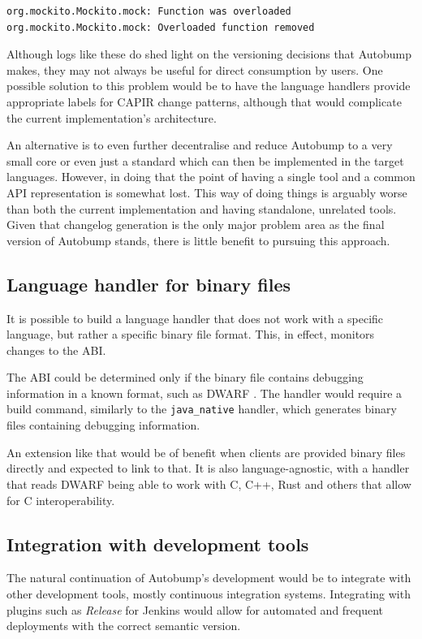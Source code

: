 \documentclass{l4proj}
\newcommand\tricksubsection[1]{
\vspace{-1\baselineskip}\subsection{#1}\vspace{-0.3\baselineskip}}
\newcommand\genericstyle{\lstset{basicstyle=\ttm}}
\newcommand\codeinline[1]{{\genericstyle\lstinline!#1!}}
\begin{document}
\begin{center}
\begin{BVerbatim}
org.mockito.Mockito.mock: Function was overloaded
org.mockito.Mockito.mock: Overloaded function removed
\end{BVerbatim}
\end{center}

Although logs like these do shed light on the versioning decisions
that Autobump makes, they may not always be useful for direct
consumption by users. One possible solution to this problem would
be to have the language handlers provide appropriate labels for CAPIR
change patterns, although that would complicate the current implementation's
architecture.

An alternative is to even further decentralise and reduce Autobump to
a very small core or even just a standard which can then be
implemented in the target languages. However, in doing that the point
of having a single tool and a common API representation is somewhat
lost. This way of doing things is arguably worse than both the current
implementation and having standalone, unrelated tools. Given that
changelog generation is the only major problem area as the final
version of Autobump stands, there is little benefit to pursuing this
approach.

\tricksubsection{Language handler for binary files}

It is possible to build a language handler that does not work with a
specific language, but rather a specific binary file format. This, in
effect, monitors changes to the ABI.

The ABI could be determined only if the binary file contains debugging
information in a known format, such as DWARF \cite{Dwarf}. The handler
would require a build command, similarly to the
\codeinline{java_native} handler, which generates binary files
containing debugging information.

An extension like that would be of benefit when clients are provided
binary files directly and expected to link to that. It is also
language-agnostic, with a handler that reads DWARF being able to work
with C, C++, Rust and others that allow for C interoperability.

\tricksubsection{Integration with development tools}

The natural continuation of Autobump's development would be to
integrate with other development tools, mostly continuous integration
systems. Integrating with plugins such as \textit{Release}
\cite{JenkinsRelease} for Jenkins would allow for automated and frequent
deployments with the correct semantic version.
\end{document}

